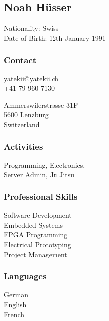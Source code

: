 \begin{facts}
    \sectionsep
    \section{Noah Hüsser}
    Nationality: Swiss\\
    Date of Birth: 12th January 1991
    \sectionsep
    
    \subsubsection{Contact}
    yatekii@yatekii.ch\\
    +41 79 960 7130\par
    \vspace{\baselineskip}
    Ammerswilerstrasse 31F\\
    5600 Lenzburg\\
    Switzerland
    \sectionsep
    
    \subsubsection{Activities}
    Programming, Electronics,\\
    Server Admin, Ju Jitsu
    \sectionsep
    
    \subsubsection{Professional Skills}
    Software Development\\
    Embedded Systems\\
    FPGA Programming\\
    Electrical Prototyping\\
    Project Management
    \sectionsep
    
    \subsubsection{Languages}
    German \\
    English \\
    French 
    \sectionsep
    

\end{facts}
